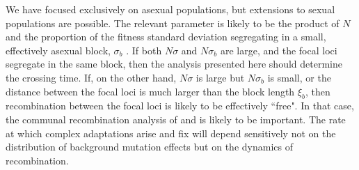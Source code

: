 \documentclass[rmp]{revtex4}
\begin{document}
We have focused exclusively on asexual populations, but extensions to sexual populations are possible.
The relevant parameter is likely to be the product of $N$ and the proportion of the fitness standard deviation segregating in a small, effectively asexual block, $\sigma_b$ \citep{neher_kessinger_2013}.
If both $N\sigma$ and $N\sigma_b$ are large, and the focal loci segregate in the same block, then the analysis presented here should determine the crossing time.
If, on the other hand, $N\sigma$ is large but $N\sigma_b$ is small, or the distance between the focal loci is much larger than the block length $\xi_b$, then recombination between the focal loci is likely to be effectively ``free".
In that case, the communal recombination analysis of \citet{neher_shraiman_2011} and \citet{neher_shraiman_2010} is likely to be important.
The rate at which complex adaptations arise and fix will depend sensitively not on the distribution of background mutation effects but on the dynamics of recombination.


\end{document}
